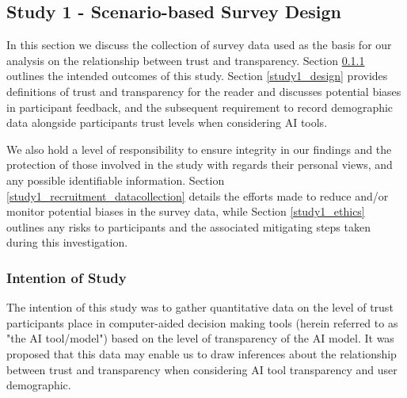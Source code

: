 \documentclass[manuscript,screen,review]{acmart}
\begin{document}




\subsection{Study 1 - Scenario-based Survey Design}

In this section we discuss the collection of survey data used as the basis for our analysis on the relationship between trust and transparency. Section \ref{study1_intentions} outlines the intended outcomes of this study. Section \ref{study1_design} provides definitions of trust and transparency for the reader and discusses potential biases in participant feedback, and the subsequent requirement to record demographic data alongside participants trust levels when considering AI tools.

We also hold a level of responsibility to ensure integrity in our findings and the protection of those involved in the study with regards their personal views, and any possible identifiable information. Section \ref{study1_recruitment_datacollection} details the efforts made to reduce and/or monitor potential biases in the survey data, while Section \ref{study1_ethics} outlines any risks to participants and the associated mitigating steps taken during this investigation.

\subsubsection{Intention of Study} 
\label{study1_intentions}
The intention of this study was to gather quantitative data on the level of trust participants place in computer-aided decision making tools (herein referred to as "the AI tool/model") based on the level of transparency of the AI model. It was proposed that this data may enable us to draw inferences about the relationship between trust and transparency when considering AI tool transparency and user demographic. 
\end{document}
